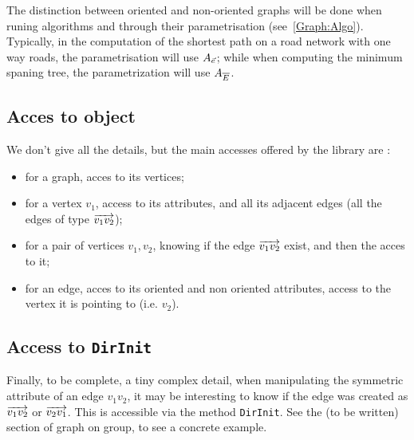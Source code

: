 The distinction between oriented and non-oriented graphs will be done when runing algorithms and through their
parametrisation (see~\ref{Graph:Algo}). Typically, in the computation of the shortest path on a road network
with one way roads, the parametrisation will use $A_{\vec{e}}$; while when computing the minimum spaning tree, 
the parametrization will use  $A_{\overline{E}}$.


\subsection{Acces to object}

We don't give all the details, but the main accesses offered by the library are :

\begin{itemize}
    \item for a graph, acces to its vertices;

    \item for a vertex $v_1$, access to its attributes, and all its adjacent edges
          (all the edges of type  $\overrightarrow{v_1 v_2}$);

    \item for a pair of vertices $v_1,v_2$, knowing if the edge $\overrightarrow{v_1 v_2}$ exist,
          and then the acces to it;

    \item for an edge, acces to its oriented and non oriented attributes, access to the vertex it is pointing to (i.e. $v_2$).
\end{itemize}



\subsection{Access to {\tt DirInit}}

Finally, to be complete, a tiny complex detail, when manipulating the symmetric
attribute of an edge $v_1v_2$, it may be interesting to know if the edge  was  created as $\overrightarrow{v_1 v_2}$
or $\overrightarrow{v_2 v_1}$. This is accessible via the method {\tt DirInit}.  See the (to
be written) section of graph on group, to see a concrete example.




